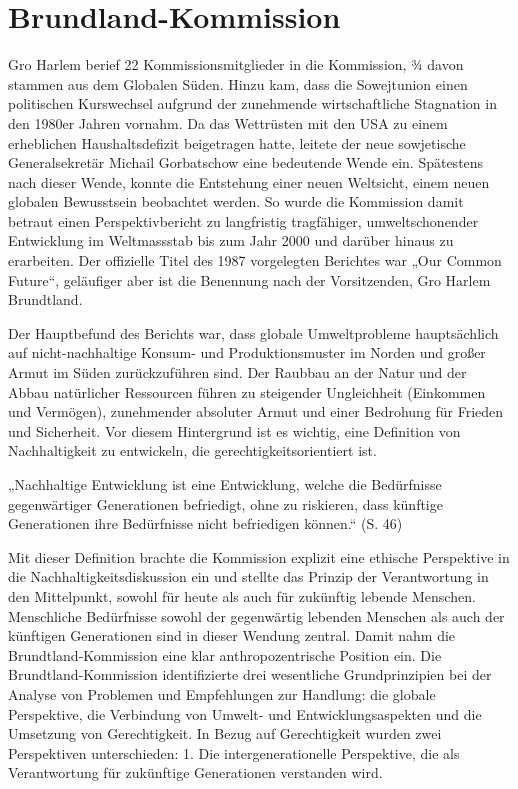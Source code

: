 \documentclass[
]{book}
\begin{document}
\hypertarget{brundland-kommission}{%
\section{Brundland-Kommission}\label{brundland-kommission}}

Gro Harlem berief 22 Kommissionsmitglieder in die Kommission, ¾ davon stammen aus dem Globalen Süden. Hinzu kam, dass die Sowejtunion einen politischen Kurswechsel aufgrund der zunehmende wirtschaftliche Stagnation in den 1980er Jahren vornahm. Da das Wettrüsten mit den USA zu einem erheblichen Haushaltsdefizit beigetragen hatte, leitete der neue sowjetische Generalsekretär Michail Gorbatschow eine bedeutende Wende ein. Spätestens nach dieser Wende, konnte die Entstehung einer neuen Weltsicht, einem neuen globalen Bewusstsein beobachtet werden. So wurde die Kommission damit betraut einen Perspektivbericht zu langfristig tragfähiger, umweltschonender Entwicklung im Weltmassstab bis zum Jahr 2000 und darüber hinaus zu erarbeiten. Der offizielle Titel des 1987 vorgelegten Berichtes war „Our Common Future``, geläufiger aber ist die Benennung nach der Vorsitzenden, Gro Harlem Brundtland.

Der Hauptbefund des Berichts war, dass globale Umweltprobleme hauptsächlich auf nicht-nachhaltige Konsum- und Produktionsmuster im Norden und großer Armut im Süden zurückzuführen sind. Der Raubbau an der Natur und der Abbau natürlicher Ressourcen führen zu steigender Ungleichheit (Einkommen und Vermögen), zunehmender absoluter Armut und einer Bedrohung für Frieden und Sicherheit. Vor diesem Hintergrund ist es wichtig, eine Definition von Nachhaltigkeit zu entwickeln, die gerechtigkeitsorientiert ist.

\begin{defbox}
„Nachhaltige Entwicklung ist eine Entwicklung, welche die Bedürfnisse gegenwärtiger Generationen befriedigt, ohne zu riskieren, dass künftige Generationen ihre Bedürfnisse nicht befriedigen können.`` (S. 46)

\end{defbox}

Mit dieser Definition brachte die Kommission explizit eine ethische Perspektive in die Nachhaltigkeitsdiskussion ein und stellte das Prinzip der Verantwortung in den Mittelpunkt, sowohl für heute als auch für zukünftig lebende Menschen. Menschliche Bedürfnisse sowohl der gegenwärtig lebenden Menschen als auch der künftigen Generationen sind in dieser Wendung zentral. Damit nahm die Brundtland-Kommission eine klar anthropozentrische Position ein. Die Brundtland-Kommission identifizierte drei wesentliche Grundprinzipien bei der Analyse von Problemen und Empfehlungen zur Handlung: die globale Perspektive, die Verbindung von Umwelt- und Entwicklungsaspekten und die Umsetzung von Gerechtigkeit. In Bezug auf Gerechtigkeit wurden zwei Perspektiven unterschieden:
1. Die intergenerationelle Perspektive, die als Verantwortung für zukünftige Generationen verstanden wird.
\end{document}

